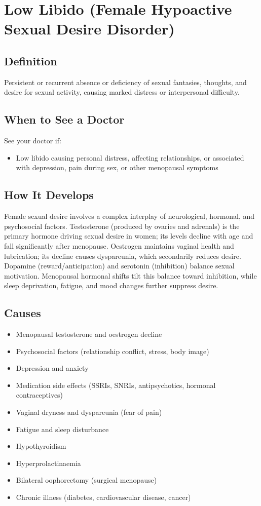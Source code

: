 \chapter{Low Libido (Female Hypoactive Sexual Desire Disorder)}

\section*{Definition}
Persistent or recurrent absence or deficiency of sexual fantasies, thoughts, and desire for sexual activity, causing marked distress or interpersonal difficulty.

\section*{When to See a Doctor}
See your doctor if:
\begin{itemize}
  \item Low libido causing personal distress, affecting relationships, or associated with depression, pain during sex, or other menopausal symptoms
\end{itemize}

\section*{How It Develops}
Female sexual desire involves a complex interplay of neurological, hormonal, and psychosocial factors. Testosterone (produced by ovaries and adrenals) is the primary hormone driving sexual desire in women; its levels decline with age and fall significantly after menopause. Oestrogen maintains vaginal health and lubrication; its decline causes dyspareunia, which secondarily reduces desire. Dopamine (reward/anticipation) and serotonin (inhibition) balance sexual motivation. Menopausal hormonal shifts tilt this balance toward inhibition, while sleep deprivation, fatigue, and mood changes further suppress desire.

\section*{Causes}
\begin{itemize}
  \item Menopausal testosterone and oestrogen decline
  \item Psychosocial factors (relationship conflict, stress, body image)
  \item Depression and anxiety
  \item Medication side effects (SSRIs, SNRIs, antipsychotics, hormonal contraceptives)
  \item Vaginal dryness and dyspareunia (fear of pain)
  \item Fatigue and sleep disturbance
  \item Hypothyroidism
  \item Hyperprolactinaemia
  \item Bilateral oophorectomy (surgical menopause)
  \item Chronic illness (diabetes, cardiovascular disease, cancer)
\end{itemize}


